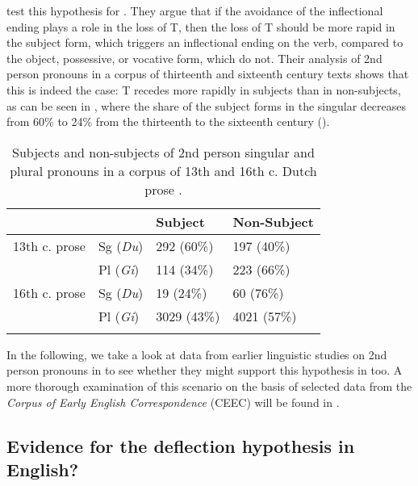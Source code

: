 \documentclass[output=paper,hidelinks]{langscibook}
\begin{document}
\citet{Aalberse2015} test this hypothesis for . They argue that if the avoidance of the inflectional ending plays a role in the loss of T, then the loss of T should be more rapid in the subject form, which triggers an inflectional ending on the verb, compared to the object, possessive, or vocative form, which do not. Their analysis of 2nd person pronouns in a corpus of thirteenth and sixteenth century  texts shows that this is indeed the case: T recedes more rapidly in subjects than in non-subjects, as can be seen in , where the share of the subject forms in the singular decreases from 60\% to 24\% from the thirteenth to the sixteenth century (\citeyear[198]{Aalberse2015}).

\begin{table}
\caption{Subjects and non-subjects of 2nd person singular and plural pronouns in a corpus of 13th and 16th c. Dutch prose \citep[adapted from][197]{Aalberse2015}.}
\label{tab6elsweiler}
 \begin{tabularx}{.8\textwidth}{Xp{1.5cm} R{2cm}R{2cm}}
  \lsptoprule
        &    & Subject & Non-Subject\\ 
  \midrule
  13th c. prose & Sg (\textit{Du}) & 292 (60\%)  & 197 (40\%) \\
    & Pl (\textit{Gi}) & 114 (34\%)  & 223 (66\%) \\
  16th c. prose  & Sg (\textit{Du}) & 19 (24\%) & 60 (76\%) \\
  	& Pl (\textit{Gi}) & 3029 (43\%)  & 4021 (57\%) \\
  \lspbottomrule
 \end{tabularx}
\end{table}

In the following, we take a look at data from earlier linguistic studies on 2nd person pronouns in  to see whether they might support this hypothesis in  too. A more thorough examination of this scenario on the basis of selected data from the \textit{Corpus of Early English Correspondence} (CEEC) will be found in \citet{Huberinprep}.

\subsection{ Evidence for the deflection hypothesis in English?}\label{sec:eh:5.3}
\end{document}
